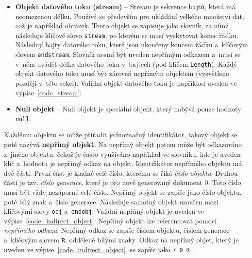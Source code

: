 \begin{itemize}
    \item \textbf{Objekt datového toku (stream)} -- Stream je sekvence bajtů, 
    která má neomezenou délku. Používá se především pro ukládání velkého množství
    dat, což je například obrázek. Tento objekt se zapisuje jako slovník, za nímž
    následuje klíčové slovo \texttt{stream}, po kterém se musí vyskytovat konec
    řádku. Následují bajty datového toku, které jsou ukončeny koncem řádku
    a~klíčovým slovem \texttt{endstream}. Slovník nesmí být uveden
    nepřímým odkazem a~musí se v~něm uvádět délka datového toku v~bajtech (pod
    klíčem \texttt{Length}). Každý objekt datového toku musí být zároveň nepřímým
    objektem (vysvětleno později v~této sekci). Validní objekt datového toku je
    například uveden ve výpise~\ref{code_stream}:

    \item \textbf{Null objekt} -- Null objekt je speciální objekt, který nabývá
    pouze hodnoty \texttt{null}.
\end{itemize}

Každému objektu se může přiřadit jednoznačný identifikátor, takový objekt se poté
nazývá \textbf{nepřímý objekt}. Na nepřímý objekt potom může být odkazováno
z~jiného objektu, čehož je často využíváno například ve slovníku, kde je uveden
klíč a~hodnota je nepřímý odkaz na objekt. Identifikátor nepřímého objektu má dvě
části. První část je kladné celé číslo, kterému se říká \emph{číslo objektu}.
Druhou částí je tzv. \emph{číslo generace}, které je pro nově generovaný dokument
0. Toto číslo musí být vždy nezáporné celé číslo. Nepřímý objekt se zapíše jako
číslo objektu, poté bílý znak a~číslo generace. Následuje samotný objekt uzavřen
mezi klíčovými slovy \texttt{obj} a~\texttt{endobj}. Validní nepřímý objekt je
uveden ve výpise~\ref{code_indirect_object}:
\noindent Nepřímý objekt lze referencovat pomocí \emph{nepřímého odkazu}.
Nepřímý odkaz se zapíše číslem objektu, číslem generace a~klíčovým slovem
\texttt{R}, oddělené bílými znaky. Odkaz na nepřímý objet, který je uveden ve
výpise~\ref{code_indirect_object}, se zapíše jako \texttt{7 0 R}.



